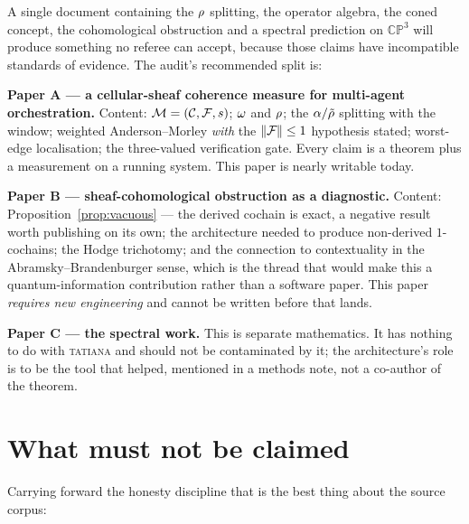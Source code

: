 \begin{hon}\Hon
A single document containing the $\rho$ splitting, the operator
algebra, the coned concept, the cohomological obstruction and a spectral
prediction on $\mathbb{CP}^3$ will produce something no referee can
accept, because those claims have incompatible standards of evidence.
The audit's recommended split is:

\textbf{Paper A --- a cellular-sheaf coherence measure for multi-agent
orchestration.} Content: $\mathcal{M}=(\mathcal{C},\mathcal{F},s)$; $\omega$ and $\rho$;
the $\alpha/\tilde{\rho}$ splitting with the window; weighted
Anderson--Morley \emph{with} the $\left\lVert \mathcal{F}_{} \right\rVert\le1$ hypothesis stated;
worst-edge localisation; the three-valued verification gate. Every claim
is a theorem plus a measurement on a running system. This paper is
nearly writable today.

\textbf{Paper B --- sheaf-cohomological obstruction as a diagnostic.}
Content: Proposition~\ref{prop:vacuous} --- the derived cochain is exact,
a negative result worth publishing on its own; the architecture needed
to produce non-derived $1$-cochains; the Hodge trichotomy; and the
connection to contextuality in the Abramsky--Brandenburger sense, which
is the thread that would make this a quantum-information contribution
rather than a software paper. This paper \emph{requires new engineering}
and cannot be written before that lands.

\textbf{Paper C --- the spectral work.} This is separate mathematics. It
has nothing to do with \textsc{tatiana} and should not be contaminated
by it; the architecture's role is to be the tool that helped, mentioned
in a methods note, not a co-author of the theorem.
\end{hon}

\section{What must not be claimed}

Carrying forward the honesty discipline that is the best thing about the
source corpus:


